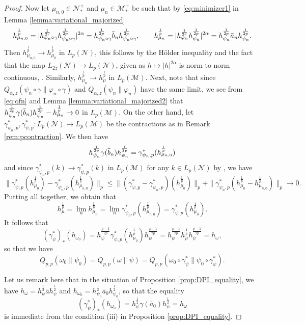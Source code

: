 \documentclass[12pt]{article}
\theoremstyle{definition}
\theoremstyle{remark}
\numberwithin{equation}{section}
\def\Me{\mathcal M}
\def\Ne{\mathcal N}
\def\ffi{\varphi}
\begin{document}
\begin{proof}
Now let $\mu_{n,0}\in \Ne_*^+$ and $\mu_n\in \Me_*^+$ be such that by  \eqref{eq:minimizer1}
in Lemma \ref{lemma:variational_majorized}
\begin{align*}
h_{\mu_{n,0}}^{\frac 1p}= |h_{\ffi_n\circ\gamma}^{1\over 2r}h_{\psi_n\circ\gamma}^{1\over 2p}|^{2\alpha}=
h_{\psi_n\circ\gamma}^{\frac 1{2p}}\bar b_{n}
h_{\psi_n\circ\gamma}^{\frac1{2p}},\qquad
h_{\mu_{n}}^{\frac1p}=|h_{\ffi_n}^{1\over 2r}h_{\psi_n}^{1\over 2p}|^{2\alpha}= h_{\psi_n}^{\frac 1{2p}}\bar a_{n}
h_{\psi_n}^{\frac1{2p}}. 
\end{align*}
Then $h_{\mu_{n,0}}^{\frac1p}\to h_{\mu_0}^{\frac1p}$ in $L_p(\Ne)$, this follows by the H\"older
inequality and the fact that the map $L_{2z}(\Ne)\to L_p(\Ne)$, given as $h\mapsto
|h|^{2\alpha}$ is norm to norm continuous, \cite{kosaki1986aplicationsuc}. Similarly,
$h_{\mu_n}^{\frac1p}\to h_\mu^{\frac1p}$ in $L_p(\Me)$. 
Next, note that since
$Q_{\alpha,z}(\psi_n\circ\gamma\|\ffi_n\circ\gamma)$ and $Q_{\alpha,z}(\psi_n\|\ffi_n)$
have the same limit, we see from \eqref{eq:qfn} and Lemma
\ref{lemma:variational_majorized2} that 
$h_{\psi_n}^{\frac 1{2p}}\gamma(\bar b_{n})h_{\psi_n}^{1\over 2p}-h_{\mu_n}^{\frac1p}\to
0$ in $L_p(\Me)$. On the other hand, let $\gamma^*_{\psi_n,p}, \gamma^*_{\psi,p}:
L_p(\Ne)\to L_p(\Me)$ be the contractions as in Remark \ref{rem:pcontraction}. We
then have 
\[
h_{\psi_n}^{\frac 1{2p}}\gamma(\bar b_{n})h_{\psi_n}^{1\over
2p}=\gamma_{\psi_{n},p}^*(h_{\mu_{n,0}}^{\frac1p})
\]
and since $\gamma^*_{\psi_{n},p}(k)\to \gamma^*_{\psi,p}(k)$ in $L_p(\Me)$ for any
$k\in L_p(\Ne)$ by \cite[Lemma 4.3]{jencova2018renyi}, we have 
\[
\|\gamma^*_{\psi,p}(h_{\mu_0}^{\frac1p})-\gamma_{\psi_{n},p}^*(h_{\mu_{n,0}}^{\frac1p})\|_p\le
\|(\gamma^*_{\psi,p}-\gamma^*_{\psi_{n},p})(h_{\mu_0}^{\frac1p})\|_p+
\|\gamma^*_{\psi_{n},p}(h_{\mu_0}^{\frac1p}-h_{\mu_{n,0}}^{\frac1p})\|_p\to 0.
\]
Putting all together, we obtain that 
\[
h_\mu^{\frac1p}=\lim_n h_{\mu_n}^{\frac1p}=\lim_n
\gamma^*_{\psi_{n},p}(h_{\mu_{n,0}}^{\frac1p})=\gamma^*_{\psi,p}(h_{\mu_0}^{\frac1p}).
\]
It follows that 
\[
(\gamma^*_{\psi})_*(h_{\omega_0})=h_{\psi}^{\frac{p-1}{2p}}\gamma^*_{\psi,p}(h_{\mu_0}^{\frac1p})h_{\psi}^{\frac{p-1}{2p}}=h_{\psi}^{\frac{p-1}{2p}}h_\mu^{\frac1p}h_{\psi}^{\frac{p-1}{2p}}=h_\omega,
\]
so that we have
\[
Q_{p,p}(\omega_0\|\psi_0)=Q_{p,p}(\omega\|\psi)=Q_{p,p}(\omega_0\circ
\gamma^*_\psi\|\psi_0\circ\gamma^*_\psi).
\]

Let us remark here that in the situation of Proposition \ref{prop:DPI_equality}, we have
$h_\omega=h_\psi^{\frac12}\bar ah_\psi^{\frac12}$ and
$h_{\omega_0}=h_{\psi_0}^{\frac12}\bar a_0h_{\psi_0}^{\frac12}$, so that the equality
\[
(\gamma^*_{\psi})_*(h_{\omega_0})=h_\psi^{\frac12}\gamma(\bar
a_0)h_\psi^{\frac12}=h_\omega
\]
is immediate from the condition (iii) in Proposition \ref{prop:DPI_equality}.



\end{proof}
\end{document}
